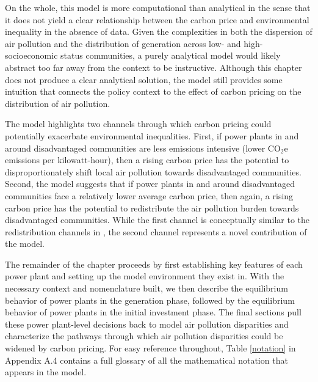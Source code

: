 On the whole, this model is more computational than analytical in the sense that it does not yield a clear relationship between the carbon price and environmental inequality in the absence of data. Given the complexities in both the dispersion of air pollution and the distribution of generation across low- and high-socioeconomic status communities, a purely analytical model would likely abstract too far away from the context to be instructive. Although this chapter does not produce a clear analytical solution, the model still provides some intuition that connects the policy context to the effect of carbon pricing on the distribution of air pollution. 

The model highlights two channels through which carbon pricing could potentially exacerbate environmental inequalities. First, if  power plants in and around disadvantaged communities are less emissions intensive (lower CO$_2$e emissions per kilowatt-hour), then a rising carbon price has the potential to disproportionately shift local air pollution towards disadvantaged communities. Second, the model suggests that if power plants in and around disadvantaged communities face a relatively lower average carbon price, then again, a rising carbon price has the potential to redistribute the air pollution burden towards disadvantaged communities. While the first channel is conceptually similar to the redistribution channels in \cite{weber2021dynamic}, the second channel represents a novel contribution of the model.


The remainder of the chapter proceeds by first establishing key features of each power plant and setting up the model environment they exist in. With the necessary context and nomenclature built, we then describe the equilibrium behavior of power plants in the generation phase, followed by the equilibrium behavior of power plants in the initial investment phase. The final sections pull these power plant-level decisions back to model air pollution disparities and characterize the pathways through which air pollution disparities could be widened by carbon pricing. For easy reference throughout, Table \ref{notation} in Appendix A.4 contains a full glossary of all the mathematical notation that appears in the model.


